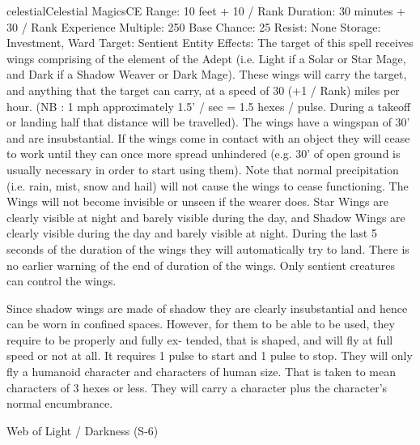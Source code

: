 \begin{College}[1.3]{celestial}{Celestial Magics}{CE}
Range: 10 feet + 10 / Rank 
Duration: 30 minutes + 30 / Rank 
Experience Multiple: 250 
Base Chance: 25%
Resist: None 
Storage: Investment, Ward 
Target: Sentient Entity 
Effects:  The  target  of  this  spell  receives  wings 
comprising  of  the  element  of  the  Adept  (i.e.  Light 
if  a  Solar  or  Star  Mage,  and  Dark  if  a  Shadow 
Weaver or Dark Mage). These wings will carry the 
target,  and  anything  that  the  target  can  carry,  at  a 
speed  of  30  (+1  /  Rank)  miles  per  hour.  (NB  :  1 
mph  approximately  1.5’  /  sec  =  1.5  hexes  /  pulse. 
During  a  takeoff  or  landing  half  that  distance  will 
be  travelled).  The  wings  have  a  wingspan  of  30’ 
and are insubstantial. If the wings come in contact 
with  an  object  they  will  cease  to  work  until  they 
can once more spread unhindered (e.g. 30’ of open 
ground  is  usually  necessary  in  order  to  start  using 
them).  Note  that  normal  precipitation  (i.e.  rain, 
mist,  snow  and  hail)  will  not  cause  the  wings  to 
cease  functioning.  The  Wings  will  not  become 
invisible  or  unseen  if the  wearer  does.  Star Wings 
are clearly visible at night and barely visible during 
the  day,  and  Shadow  Wings  are  clearly  visible 
during  the  day  and  barely  visible  at  night.  During 
the last 5 seconds of the duration of the wings they 
will  automatically  try  to  land.  There  is  no  earlier 
warning of the end of duration of the  wings. Only 
sentient creatures can control the wings. 

Since  shadow  wings  are  made  of  shadow  they  are 
clearly  insubstantial  and  hence  can  be  worn  in 
confined  spaces.  However,  for  them  to  be  able  to 
be  used,  they  require  to  be  properly  and  fully  ex-
tended, that is shaped, and will fly at full speed or 
not at all. It requires 1 pulse to start and 1 pulse to 
stop.  They  will  only  fly  a  humanoid character  and 
characters  of  human  size.  That  is  taken  to  mean 
characters  of  3  hexes  or  less.  They  will  carry  a 
character plus the character’s normal encumbrance. 

Web of Light / Darkness (S-6) 


\end{College}
